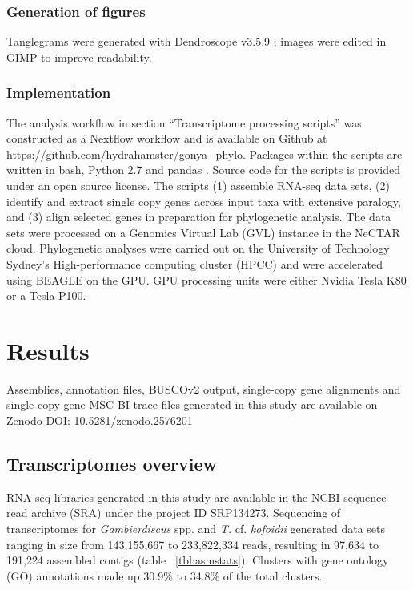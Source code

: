 \documentclass[fleqn,10pt,lineno]{wlpeerj} %
\begin{document}
\subsubsection*{Generation of figures}
Tanglegrams were generated with Dendroscope v3.5.9 \citep{huson2007dendroscope}; images were edited in GIMP \citep{gimp2008image} to improve readability.

\subsubsection*{Implementation}
The analysis workflow in section ``Transcriptome processing scripts'' was constructed as a Nextflow workflow \citep{di2017nextflow} and is available on Github at https://github.com/hydrahamster/gonya\_phylo. 
Packages within the scripts are written in bash, Python 2.7 \citep{stevens2018python} and pandas \citep{pandas}. 
Source code for the scripts is provided under an open source license.
The scripts (1) assemble RNA-seq data sets, (2) identify and extract single copy genes across input taxa with extensive paralogy, and (3) align selected genes in preparation for phylogenetic analysis.
The data sets were processed on a Genomics Virtual Lab (GVL) \citep{afgan2015genomics} instance in the NeCTAR cloud.
Phylogenetic analyses were carried out on the University of Technology Sydney's High-performance computing cluster (HPCC) and were accelerated using BEAGLE \citep{ayres2011beagle} on the GPU.
GPU processing units were either Nvidia Tesla K80 or a Tesla P100.

\section*{Results}
Assemblies, annotation files, BUSCOv2 output, single-copy gene alignments and single copy gene MSC BI trace files generated in this study are available on Zenodo DOI: 10.5281/zenodo.2576201

\subsection*{Transcriptomes overview}
RNA-seq libraries generated in this study are available in the NCBI sequence read archive (SRA) under the project ID SRP134273.
Sequencing of transcriptomes for \emph{Gambierdiscus} spp. and \emph{T.} cf. \emph{kofoidii} generated data sets ranging in size from 143,155,667 to 233,822,334 reads, resulting in 97,634 to 191,224 assembled contigs (table ~\ref{tbl:asmstats}). 
Clusters with gene ontology (GO) annotations made up 30.9\% to 34.8\% of the total clusters. 
\end{document}
